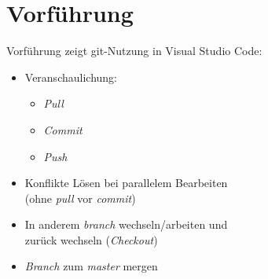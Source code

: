 \section{Vorführung}
\begin{frame}
Vorführung zeigt git-Nutzung in Visual Studio Code:
\begin{itemize}
\item Veranschaulichung:
\begin{itemize}
\item \emph{Pull}
\item \emph{Commit}
\item \emph{Push}
\end{itemize}
\item Konflikte Lösen bei parallelem Bearbeiten\\
(ohne \emph{pull} vor \emph{commit})
\item In anderem \emph{branch} wechseln/arbeiten und\\
zurück wechseln (\emph{Checkout})
\item \emph{Branch} zum \emph{master} mergen
\end{itemize}
\end{frame}
